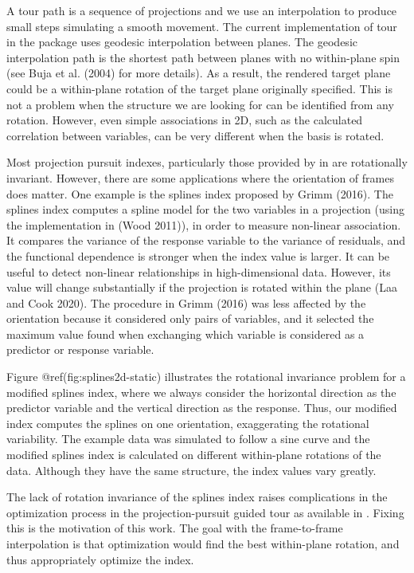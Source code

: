 \documentclass[
]{article}
\begin{document}
A tour path is a sequence of projections and we use an interpolation to
produce small steps simulating a smooth movement. The current
implementation of tour in the  package uses geodesic
interpolation between planes. The geodesic interpolation path is the
shortest path between planes with no within-plane spin (see Buja et al.
(2004) for more details). As a result, the rendered target plane could
be a within-plane rotation of the target plane originally specified.
This is not a problem when the structure we are looking for can be
identified from any rotation. However, even simple associations in 2D,
such as the calculated correlation between variables, can be very
different when the basis is rotated.

Most projection pursuit indexes, particularly those provided by in
 are rotationally invariant. However, there are some
applications where the orientation of frames does matter. One example is
the splines index proposed by Grimm (2016). The splines index computes a
spline model for the two variables in a projection (using the
implementation in  (Wood 2011)), in order to measure
non-linear association. It compares the variance of the response
variable to the variance of residuals, and the functional dependence is
stronger when the index value is larger. It can be useful to detect
non-linear relationships in high-dimensional data. However, its value
will change substantially if the projection is rotated within the plane
(Laa and Cook 2020). The procedure in Grimm (2016) was less affected by
the orientation because it considered only pairs of variables, and it
selected the maximum value found when exchanging which variable is
considered as a predictor or response variable.

Figure @ref(fig:splines2d-static) illustrates the rotational invariance
problem for a modified splines index, where we always consider the
horizontal direction as the predictor variable and the vertical
direction as the response. Thus, our modified index computes the splines
on one orientation, exaggerating the rotational variability. The example
data was simulated to follow a sine curve and the modified splines index
is calculated on different within-plane rotations of the data. Although
they have the same structure, the index values vary greatly.

The lack of rotation invariance of the splines index raises
complications in the optimization process in the projection-pursuit
guided tour as available in . Fixing this is the
motivation of this work. The goal with the frame-to-frame interpolation
is that optimization would find the best within-plane rotation, and thus
appropriately optimize the index.
\end{document}
